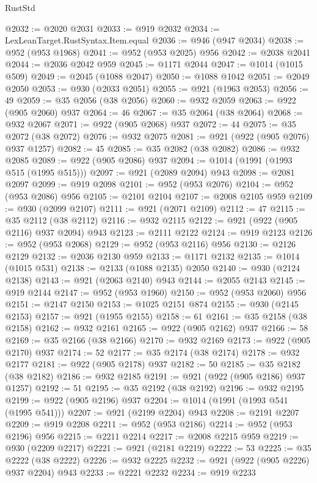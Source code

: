 \begin{lexlean}{RustStd}
\begin{coremodule}
@2032 := @2020 @2031
@2033 := @919 @2032
@2034 := LexLeanTarget.RustSyntax.Item.equal
@2036 := @946 (@947 @2034)
@2038 := @952 (@953 @1968)
@2041 := @952 (@953 @2025) @956
@2042 := @2038 @2041
@2044 := @2036 @2042 @959
@2045 := @1171 @2044
@2047 := @1014 (@1015 @509)
@2049 := @2045 (@1088 @2047)
@2050 := @1088 @1042
@2051 := @2049 @2050
@2053 := @930 (@2033 @2051)
@2055 := @921 (@1963 @2053)
@2056 := 49
@2059 := @35 @2056 (@38 @2056)
@2060 := @932 @2059
@2063 := @922 (@905 @2060) @937
@2064 := 46
@2067 := @35 @2064 (@38 @2064)
@2068 := @932 @2067
@2071 := @922 (@905 @2068) @937
@2072 := 44
@2075 := @35 @2072 (@38 @2072)
@2076 := @932 @2075
@2081 := @921 (@922 (@905 @2076) @937 @1257)
@2082 := 45
@2085 := @35 @2082 (@38 @2082)
@2086 := @932 @2085
@2089 := @922 (@905 @2086) @937
@2094 := @1014 (@1991 (@1993 @515 (@1995 @515)))
@2097 := @921 (@2089 @2094) @943
@2098 := @2081 @2097
@2099 := @919 @2098
@2101 := @952 (@953 @2076)
@2104 := @952 (@953 @2086) @956
@2105 := @2101 @2104
@2107 := @2008 @2105 @959
@2109 := @930 (@2099 @2107)
@2111 := @921 (@2071 @2109)
@2112 := 47
@2115 := @35 @2112 (@38 @2112)
@2116 := @932 @2115
@2122 := @921 (@922 (@905 @2116) @937 @2094) @943
@2123 := @2111 @2122
@2124 := @919 @2123
@2126 := @952 (@953 @2068)
@2129 := @952 (@953 @2116) @956
@2130 := @2126 @2129
@2132 := @2036 @2130 @959
@2133 := @1171 @2132
@2135 := @1014 (@1015 @531)
@2138 := @2133 (@1088 @2135) @2050
@2140 := @930 (@2124 @2138)
@2143 := @921 (@2063 @2140) @943
@2144 := @2055 @2143
@2145 := @919 @2144
@2147 := @952 (@953 @1960)
@2150 := @952 (@953 @2060) @956
@2151 := @2147 @2150
@2153 := @1025 @2151 @874
@2155 := @930 (@2145 @2153)
@2157 := @921 (@1955 @2155)
@2158 := 61
@2161 := @35 @2158 (@38 @2158)
@2162 := @932 @2161
@2165 := @922 (@905 @2162) @937
@2166 := 58
@2169 := @35 @2166 (@38 @2166)
@2170 := @932 @2169
@2173 := @922 (@905 @2170) @937
@2174 := 52
@2177 := @35 @2174 (@38 @2174)
@2178 := @932 @2177
@2181 := @922 (@905 @2178) @937
@2182 := 50
@2185 := @35 @2182 (@38 @2182)
@2186 := @932 @2185
@2191 := @921 (@922 (@905 @2186) @937 @1257)
@2192 := 51
@2195 := @35 @2192 (@38 @2192)
@2196 := @932 @2195
@2199 := @922 (@905 @2196) @937
@2204 := @1014 (@1991 (@1993 @541 (@1995 @541)))
@2207 := @921 (@2199 @2204) @943
@2208 := @2191 @2207
@2209 := @919 @2208
@2211 := @952 (@953 @2186)
@2214 := @952 (@953 @2196) @956
@2215 := @2211 @2214
@2217 := @2008 @2215 @959
@2219 := @930 (@2209 @2217)
@2221 := @921 (@2181 @2219)
@2222 := 53
@2225 := @35 @2222 (@38 @2222)
@2226 := @932 @2225
@2232 := @921 (@922 (@905 @2226) @937 @2204) @943
@2233 := @2221 @2232
@2234 := @919 @2233

\end{coremodule}
\end{lexlean}
